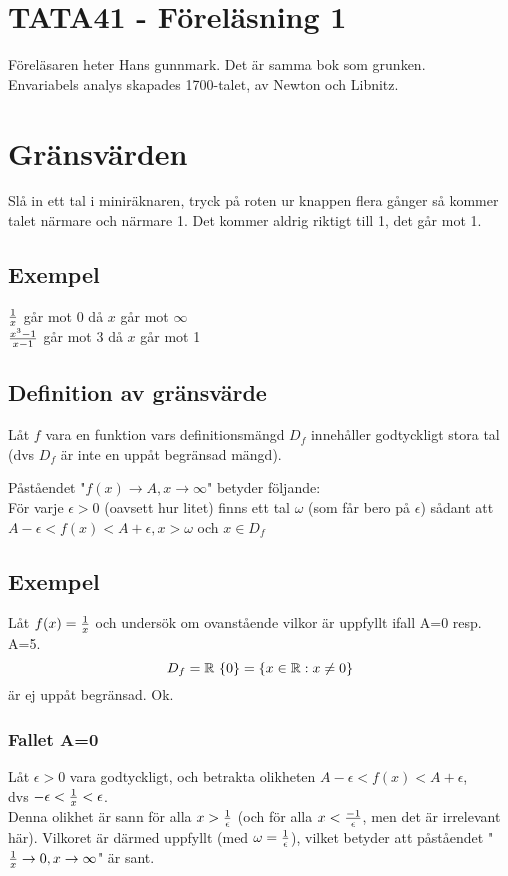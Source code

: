 \documentclass{article}
\begin{document}
\section{TATA41 - Föreläsning 1}
Föreläsaren heter Hans gunnmark. Det är samma bok som grunken.\\
Envariabels analys skapades 1700-talet, av Newton och Libnitz.\\

\section{Gränsvärden}
Slå in ett tal i miniräknaren, tryck på roten ur knappen flera gånger så kommer talet närmare och närmare 1.
Det kommer aldrig riktigt till 1, det går mot 1.

\subsection{Exempel}
$\frac{1}{x}$ går mot 0 då $x$ går mot $\infty$\\
$\frac{x^3-1}{x-1}$ går mot 3 då $x$ går mot 1

\subsection{Definition av gränsvärde}
Låt $f$ vara en funktion vars definitionsmängd $D_f$ innehåller godtyckligt stora tal
(dvs $D_f$ är inte en uppåt begränsad mängd).

Påståendet "$f(x) \to A, x \to \infty$" betyder följande:\\
För varje $\epsilon>0$ (oavsett hur litet) finns ett tal $\omega$ (som får bero på $\epsilon$)
sådant att $A-\epsilon < f(x) < A+\epsilon, x>\omega$ och $x\in D_f$

\subsection{Exempel}
Låt $f(x)=\frac{1}{x}$ och undersök om ovanstående vilkor är uppfyllt ifall A=0 resp. A=5.\\
$$ D_f = {\mathbb R} \ \{0\} = \{x\in{\mathbb R}:x\neq 0\} $$ är ej uppåt begränsad. Ok.\\

\subsubsection{Fallet A=0}
Låt $\epsilon > 0$ vara godtyckligt, och betrakta olikheten $A-\epsilon<f(x)<A+\epsilon$,\\
dvs $-\epsilon<\frac{1}{x}<\epsilon$.\\
Denna olikhet är sann för alla $x > \frac{1}{\epsilon}$ (och för alla $x<\frac{-1}{\epsilon}$, men det är irrelevant här).
Vilkoret är därmed uppfyllt (med $\omega=\frac{1}{\epsilon}$), vilket betyder att påståendet "$\frac{1}{x} \to 0, x\to\infty$" är sant.
\end{document}
